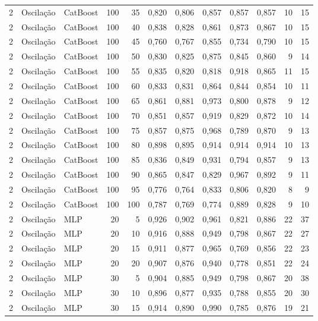 \begin{longtable}{@{}rllrrrrrrrrr@{}}
2 & Oscilação & CatBoost & 100 & 35 & 0,820 & 0,806 & 0,857 & 0,857 & 0,857 & 10 & 15 \\
2 & Oscilação & CatBoost & 100 & 40 & 0,838 & 0,828 & 0,861 & 0,873 & 0,867 & 10 & 15 \\
2 & Oscilação & CatBoost & 100 & 45 & 0,760 & 0,767 & 0,855 & 0,734 & 0,790 & 10 & 15 \\
2 & Oscilação & CatBoost & 100 & 50 & 0,830 & 0,825 & 0,875 & 0,845 & 0,860 & 9 & 14 \\
2 & Oscilação & CatBoost & 100 & 55 & 0,835 & 0,820 & 0,818 & 0,918 & 0,865 & 11 & 15 \\
2 & Oscilação & CatBoost & 100 & 60 & 0,833 & 0,831 & 0,864 & 0,844 & 0,854 & 10 & 11 \\
2 & Oscilação & CatBoost & 100 & 65 & 0,861 & 0,881 & 0,973 & 0,800 & 0,878 & 9 & 12 \\
2 & Oscilação & CatBoost & 100 & 70 & 0,851 & 0,857 & 0,919 & 0,829 & 0,872 & 10 & 14 \\
2 & Oscilação & CatBoost & 100 & 75 & 0,857 & 0,875 & 0,968 & 0,789 & 0,870 & 9 & 13 \\
2 & Oscilação & CatBoost & 100 & 80 & 0,898 & 0,895 & 0,914 & 0,914 & 0,914 & 10 & 13 \\
2 & Oscilação & CatBoost & 100 & 85 & 0,836 & 0,849 & 0,931 & 0,794 & 0,857 & 9 & 13 \\
2 & Oscilação & CatBoost & 100 & 90 & 0,865 & 0,847 & 0,829 & 0,967 & 0,892 & 9 & 11 \\
2 & Oscilação & CatBoost & 100 & 95 & 0,776 & 0,764 & 0,833 & 0,806 & 0,820 & 8 & 9 \\
2 & Oscilação & CatBoost & 100 & 100 & 0,787 & 0,769 & 0,774 & 0,889 & 0,828 & 9 & 10 \\
2 & Oscilação & MLP & 20 & 5 & 0,926 & 0,902 & 0,961 & 0,821 & 0,886 & 22 & 37 \\
2 & Oscilação & MLP & 20 & 10 & 0,916 & 0,888 & 0,949 & 0,798 & 0,867 & 22 & 27 \\
2 & Oscilação & MLP & 20 & 15 & 0,911 & 0,877 & 0,965 & 0,769 & 0,856 & 22 & 23 \\
2 & Oscilação & MLP & 20 & 20 & 0,907 & 0,876 & 0,940 & 0,778 & 0,851 & 22 & 24 \\
2 & Oscilação & MLP & 30 & 5 & 0,904 & 0,885 & 0,949 & 0,798 & 0,867 & 20 & 38 \\
2 & Oscilação & MLP & 30 & 10 & 0,896 & 0,877 & 0,935 & 0,788 & 0,855 & 20 & 30 \\
2 & Oscilação & MLP & 30 & 15 & 0,914 & 0,890 & 0,990 & 0,785 & 0,876 & 19 & 21 \\

\end{longtable}
